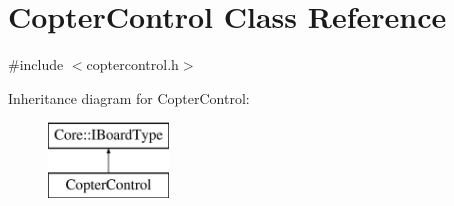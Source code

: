 \hypertarget{class_copter_control}{\section{\-Copter\-Control \-Class \-Reference}
\label{class_copter_control}
}


{\ttfamily \#include $<$coptercontrol.\-h$>$}

\-Inheritance diagram for \-Copter\-Control\-:\begin{figure}[H]
\begin{center}
\leavevmode
\includegraphics[height=2.000000cm]{class_copter_control}
\end{center}
\end{figure}
